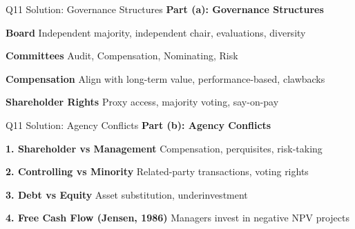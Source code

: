 \documentclass[aspectratio=169,10pt]{beamer}
\renewcommand{\small}{\fontsize{6pt}{7.5pt}\selectfont}
\renewcommand{\large}{\fontsize{8pt}{10pt}\selectfont}
\newcommand{\question}[1]{{\large\bfseries\color{crimson}#1}}
\begin{document}
	\begin{frame}{Q11 Solution: Governance Structures}
		\question{Part (a): Governance Structures}
		\small
		
		\textbf{Board}
		Independent majority, independent chair, evaluations, diversity
		
		\vspace{0.1cm}
		\textbf{Committees}
		Audit, Compensation, Nominating, Risk
		
		\vspace{0.1cm}
		\textbf{Compensation}
		Align with long-term value, performance-based, clawbacks
		
		\vspace{0.1cm}
		\textbf{Shareholder Rights}
		Proxy access, majority voting, say-on-pay
	\end{frame}
	
	\begin{frame}{Q11 Solution: Agency Conflicts}
		\question{Part (b): Agency Conflicts}
		\small
		
		\textbf{1. Shareholder vs Management}
		Compensation, perquisites, risk-taking
		
		\vspace{0.1cm}
		\textbf{2. Controlling vs Minority}
		Related-party transactions, voting rights
		
		\vspace{0.1cm}
		\textbf{3. Debt vs Equity}
		Asset substitution, underinvestment
		
		\vspace{0.1cm}
		\textbf{4. Free Cash Flow (Jensen, 1986)}
		Managers invest in negative NPV projects
	\end{frame}
	
\end{document}
